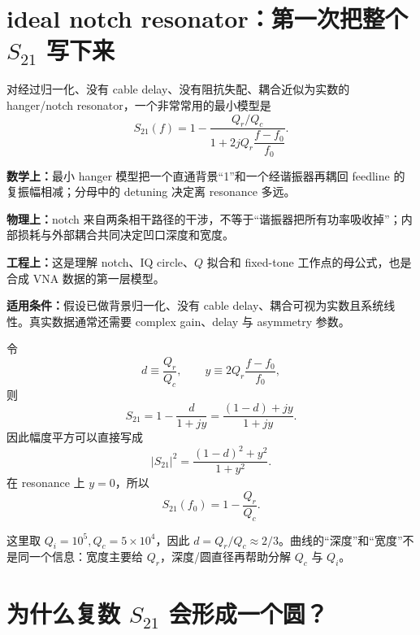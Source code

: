 \documentclass[11pt,a4paper,openany]{ctexrep}
\newcommand{\formulaexplain}[4]{%
\begin{formulaguidebox}
\textbf{\color{KidBlue}数学上：}#1\par
\textbf{\color{KidTeal}物理上：}#2\par
\textbf{\color{KidGold!55!black}工程上：}#3\par
\textbf{\color{KidRed}适用条件：}#4
\end{formulaguidebox}%
}
\begin{document}
\section{ideal notch resonator：第一次把整个 $S_{21}$ 写下来}

对经过归一化、没有 cable delay、没有阻抗失配、耦合近似为实数的 hanger/notch resonator，一个非常常用的最小模型是
\[
\boxed{
S_{21}(f)
=1-
\frac{Q_r/Q_c}
{1+2jQ_r\dfrac{f-f_0}{f_0}}.
}
\]
\formulaexplain
{最小 hanger 模型把一个直通背景“1”和一个经谐振器再耦回 feedline 的复振幅相减；分母中的 detuning 决定离 resonance 多远。}
{notch 来自两条相干路径的干涉，不等于“谐振器把所有功率吸收掉”；内部损耗与外部耦合共同决定凹口深度和宽度。}
{这是理解 notch、IQ circle、$Q$ 拟合和 fixed-tone 工作点的母公式，也是合成 VNA 数据的第一层模型。}
{假设已做背景归一化、没有 cable delay、耦合可视为实数且系统线性。真实数据通常还需要 complex gain、delay 与 asymmetry 参数。}
令
\[
d\equiv\frac{Q_r}{Q_c},
\qquad
y\equiv2Q_r\frac{f-f_0}{f_0},
\]
则
\[
S_{21}=1-\frac{d}{1+jy}
=\frac{(1-d)+jy}{1+jy}.
\]
因此幅度平方可以直接写成
\[
\boxed{
|S_{21}|^2=\frac{(1-d)^2+y^2}{1+y^2}.
}
\]
在 resonance 上 $y=0$，所以
\[
\boxed{
S_{21}(f_0)=1-\frac{Q_r}{Q_c}.
}
\]

\begin{center}
\end{center}

这里取 $Q_i=10^5,Q_c=5\times10^4$，因此 $d=Q_r/Q_c\approx2/3$。曲线的“深度”和“宽度”不是同一个信息：宽度主要给 $Q_r$，深度/圆直径再帮助分解 $Q_c$ 与 $Q_i$。

\section{为什么复数 $S_{21}$ 会形成一个圆？}
\end{document}
